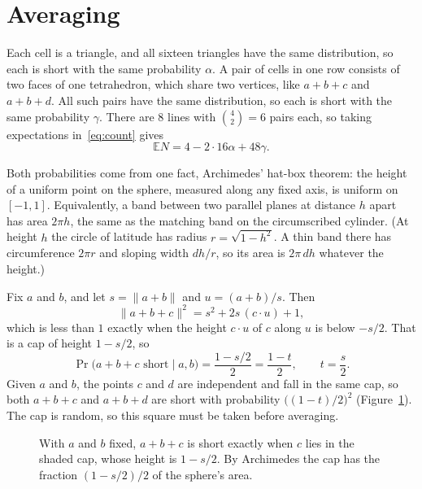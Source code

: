 \documentclass[11pt,a4paper]{article}
\newcommand{\E}{\mathbb{E}}
\begin{document}
\section{Averaging}\label{sec:average}

Each cell is a triangle, and all sixteen triangles have the same
distribution, so each is short with the same probability $\alpha$. A pair of
cells in one row consists of two faces of one tetrahedron, which share two
vertices, like $a+b+c$ and $a+b+d$. All such pairs have the same
distribution, so each is short with the same probability $\gamma$. There
are $8$ lines with $\binom42=6$ pairs each, so taking expectations
in~\eqref{eq:count} gives
\begin{equation}\label{eq:EN2}
 \E N=4-2\cdot16\alpha+48\gamma .
\end{equation}

Both probabilities come from one fact, Archimedes' hat-box theorem: the
height of a uniform point on the sphere, measured along any fixed axis, is
uniform on $[-1,1]$. Equivalently, a band between two parallel planes at
distance $h$ apart has area $2\pi h$, the same as the matching band on the
circumscribed cylinder. (At height $h$ the circle of latitude has radius
$r=\sqrt{1-h^2}$. A thin band there has circumference $2\pi r$ and sloping
width $dh/r$, so its area is $2\pi\,dh$ whatever the height.)

Fix $a$ and $b$, and let $s=\|a+b\|$ and $u=(a+b)/s$. Then
\[
 \|a+b+c\|^2=s^2+2s\,(c\cdot u)+1,
\]
which is less than $1$ exactly when the height $c\cdot u$ of $c$ along $u$
is below $-s/2$. That is a cap of height $1-s/2$, so
\[
 \Pr\bigl(a+b+c\text{ short}\mid a,b\bigr)=\frac{1-s/2}{2}=\frac{1-t}{2},
 \qquad t=\frac s2 .
\]
Given $a$ and $b$, the points $c$ and $d$ are independent and fall in the
same cap, so both $a+b+c$ and $a+b+d$ are short with probability
$\bigl((1-t)/2\bigr)^2$ (Figure~\ref{fig:cap}). The cap is random, so this
square must be taken before averaging.

\begin{figure}[ht]
\centering
{}
\caption{With $a$ and $b$ fixed, $a+b+c$ is short exactly when $c$ lies in
the shaded cap, whose height is $1-s/2$. By Archimedes the cap has the
fraction $(1-s/2)/2$ of the sphere's area.}
\label{fig:cap}
\end{figure}
\end{document}
